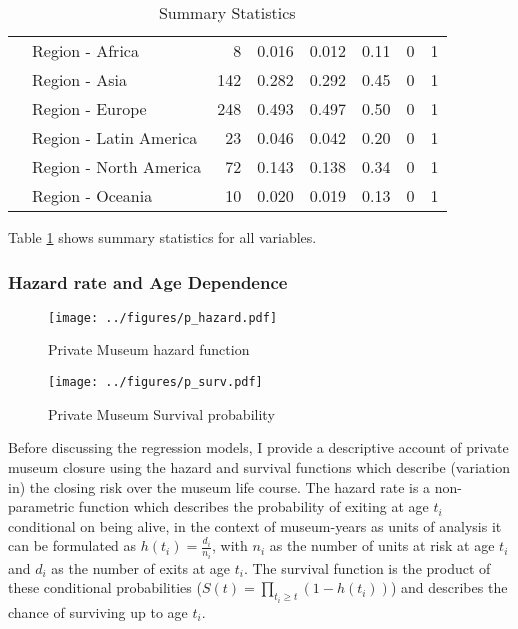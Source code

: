 \documentclass[12pt]{article}
\begin{document}
\begin{table}[ht]
\begin{tabular}{llrrrrrr}
   & Region - Africa & 8 & 0.016 & 0.012 & 0.11 & 0 & 1 \\ 
   & Region - Asia & 142 & 0.282 & 0.292 & 0.45 & 0 & 1 \\ 
   & Region - Europe & 248 & 0.493 & 0.497 & 0.50 & 0 & 1 \\ 
   & Region - Latin America & 23 & 0.046 & 0.042 & 0.20 & 0 & 1 \\ 
   & Region - North America & 72 & 0.143 & 0.138 & 0.34 & 0 & 1 \\ 
   & Region - Oceania & 10 & 0.020 & 0.019 & 0.13 & 0 & 1 \\ 
   \hline
\end{tabular}
\caption{Summary Statistics} 
\label{tbl:t_sumstats}
\end{table}

Table \ref{tbl:t_sumstats} shows summary statistics for all variables.
\subsubsection*{Hazard rate and Age Dependence}


\begin{figure}[htbp]
\centering
\texttt{[image: ../figures/p\_hazard.pdf]}
\caption{\label{fig:p_hazard}Private Museum hazard function}
\end{figure}

\begin{figure}[htbp]
\centering
\texttt{[image: ../figures/p\_surv.pdf]}
\caption{\label{fig:p_surv}Private Museum Survival probability}
\end{figure}


Before discussing the regression models, I provide a descriptive account of private museum closure using the hazard and survival functions which describe (variation in) the closing risk over the museum life course.
The hazard rate is a non-parametric function which describes the probability of exiting at age \(t_i\) conditional on being alive, in the context of museum-years as units of analysis it can be formulated as \(h(t_i) = \frac{d_i}{n_i}\), with \(n_i\) as the number of units at risk at age \(t_i\) and \(d_i\) as the number of exits at age \(t_i\).
The survival function is the product of these conditional probabilities (\(S(t) = \prod_{t_i \geq t} \left(1-h(t_i) \right)\)) and describes the chance of surviving up to age \(t_i\). 
\end{document}
